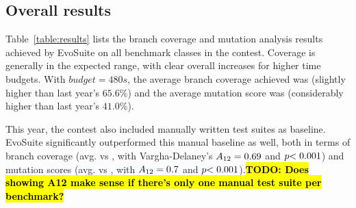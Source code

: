 \documentclass[10pt,conference]{IEEEtran}
\newcommand{\EVOSUITE}{{\sc EvoSuite}\xspace}
\newcommand{\TODO}[1]{\sethlcolor{yellow}\textbf{\textcolor{ScarletRed}{\hl{TODO: #1}}}\xspace}
\begin{document}
\begin{table*}[t]
  \centering
  \caption{\label{table:results}Detailed results of \EVOSUITE on the SBST benchmark classes.}
\resizebox{\textwidth}{!}{  

}	
\end{table*}

% 

% 

\subsection{Overall results}

Table~\ref{table:results} lists the branch coverage and mutation
analysis results achieved by \EVOSUITE on all benchmark classes in the
contest. Coverage is generally in the expected range, with clear
overall increases for higher time budgets. With $budget=480s$, the
average branch coverage achieved was \AvgCovG (slightly higher than
last year's $65.6\%$) and the average mutation score was \AvgMutG
(considerably higher than last year's $41.0\%$).

This year, the contest also included manually written test suites as
baseline. \EVOSUITE significantly outperformed this manual baseline as
well, both in terms of branch coverage (avg. \AvgCovEvosuite vs
\AvgCovManual, with Vargha-Delaney's $A_{12}={0.69}$ and
$p{<0.001}$) and mutation scores (avg. \AvgMutEvosuite vs
\AvgMutManual, with $A_{12}={0.7}$ and
$p{<0.001}$).\TODO{Does showing A12 make sense if there's only one
  manual test suite per benchmark?}


\end{document}
